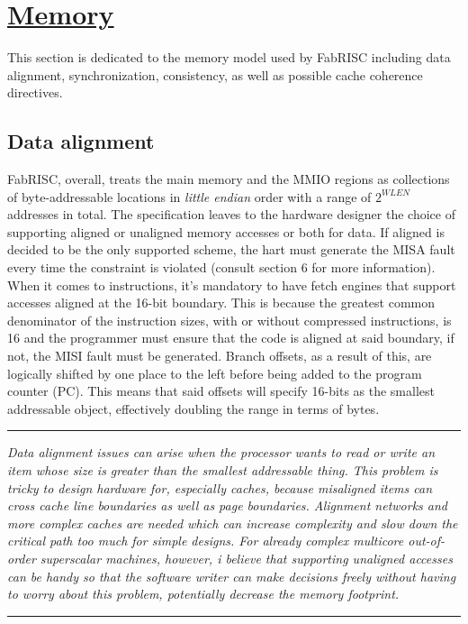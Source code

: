\section[Memory]{\LARGE\underline{Memory}}

    \vspace{10pt}

    This section is dedicated to the memory model used by FabRISC including data alignment, synchronization, consistency, as well as possible cache coherence directives.

    \subsection[Data alignment]{Data alignment}

        \vspace{10pt}

        FabRISC, overall, treats the main memory and the MMIO regions as collections of byte-addressable locations in \textit{little endian} order with a range of \(2^{WLEN}\) addresses in total. The specification leaves to the hardware designer the choice of supporting aligned or unaligned memory accesses or both for data. If aligned is decided to be the only supported scheme, the hart must generate the MISA fault every time the constraint is violated (consult section 6 for more information). When it comes to instructions, it's mandatory to have fetch engines that support accesses aligned at the 16-bit boundary. This is because the greatest common denominator of the instruction sizes, with or without compressed instructions, is 16 and the programmer must ensure that the code is aligned at said boundary, if not, the MISI fault must be generated. Branch offsets, as a result of this, are logically shifted by one place to the left before being added to the program counter (PC). This means that said offsets will specify 16-bits as the smallest addressable object, effectively doubling the range in terms of bytes.

    \par\noindent\rule{\textwidth}{0.4pt}
    \textit{Data alignment issues can arise when the processor wants to read or write an item whose size is greater than the smallest addressable thing. This problem is tricky to design hardware for, especially caches, because misaligned items can cross cache line boundaries as well as page boundaries. Alignment networks and more complex caches are needed which can increase complexity and slow down the critical path too much for simple designs. For already complex multicore out-of-order superscalar machines, however, i believe that supporting unaligned accesses can be handy so that the software writer can make decisions freely without having to worry about this problem, potentially decrease the memory footprint.}
    \par\noindent\rule{\textwidth}{0.4pt}

